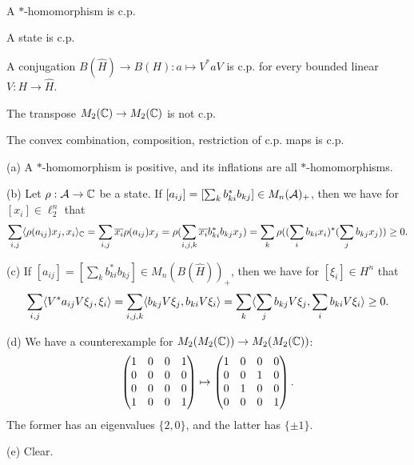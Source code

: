 \documentclass{../../../small}
\begin{document}
\begin{ex}\,
\begin{parts}
\item A $*$-homomorphism is c.p.
\item A state is c.p.
\item A conjugation $B(\hat H)\to B(H):a\mapsto V^*aV$ is c.p. for every bounded linear $V:H\to\hat H$.
\item The transpose $M_2(\mathbb{C})\to M_2(\mathbb{C})$ is not c.p.
\item The convex combination, composition, restriction of c.p. maps is c.p.
\end{parts}
\end{ex}
\begin{pf}
(a)
A $*$-homomorphism is positive, and its inflations are all $*$-homomorphisms.

(b)
Let $\rho:\mathcal{A}\to\mathbb{C}$ be a state.
If $[a_{ij}]=[\sum_kb_{ki}^*b_{kj}]\in M_n(\mathcal{A})_+$, then we have for $[x_i]\in\ell_2^n$ that
\[\sum_{i,j}\langle\rho(a_{ij})x_j,x_i\rangle_{\mathbb{C}}=\sum_{i,j}\overline{x_i}\rho(a_{ij})x_j=\rho(\sum_{i,j,k}\overline{x_i}b_{ki}^*b_{kj}x_j)=\sum_k\rho((\sum_ib_{ki}x_i)^*(\sum_jb_{kj}x_j))\ge0.\]

(c)
If $[a_{ij}]=[\sum_kb_{ki}^*b_{kj}]\in M_n(B(\hat H))_+$, then we have for $[\xi_i]\in H^n$ that
\[\sum_{i,j}\langle V^*a_{ij}V\xi_j,\xi_i\rangle=\sum_{i,j,k}\langle b_{kj}V\xi_j,b_{ki}V\xi_i\rangle=\sum_k\langle\sum_jb_{kj}V\xi_j,\sum_ib_{ki}V\xi_i\rangle\ge0.\]

(d)
We have a counterexample for $M_2(M_2(\mathbb{C}))\to M_2(M_2(\mathbb{C}))$:
\[\begin{pmatrix}1&0&0&1\\0&0&0&0\\0&0&0&0\\1&0&0&1\end{pmatrix}\mapsto\begin{pmatrix}1&0&0&0\\0&0&1&0\\0&1&0&0\\0&0&0&1\end{pmatrix}.\]
The former has an eigenvalues $\{2,0\}$, and the latter has $\{\pm1\}$.

(e) Clear.
\end{pf}
\end{document}
